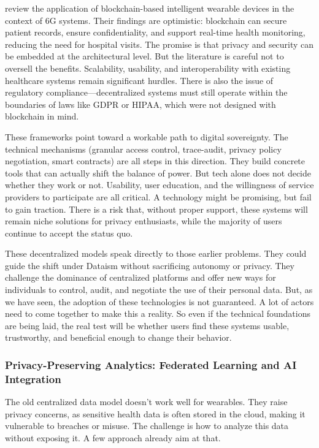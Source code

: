 	\cite{Boonsong2024} review the application of blockchain-based intelligent wearable devices in the context of 6G systems. Their findings are optimistic: blockchain can secure patient records, ensure confidentiality, and support real-time health monitoring, reducing the need for hospital visits. The promise is that privacy and security can be embedded at the architectural level. But the literature is careful not to oversell the benefits. Scalability, usability, and interoperability with existing healthcare systems remain significant hurdles. There is also the issue of regulatory compliance—decentralized systems must still operate within the boundaries of laws like GDPR or HIPAA, which were not designed with blockchain in mind.

	These frameworks point toward a workable path to digital sovereignty. The technical mechanisms (granular access control, trace-audit, privacy policy negotiation, smart contracts) are all steps in this direction. They build concrete tools that can actually shift the balance of power. But tech alone does not decide whether they work or not. Usability, user education, and the willingness of service providers to participate are all critical. A technology might be promising, but fail to gain traction. There is a risk that, without proper support, these systems will remain niche solutions for privacy enthusiasts, while the majority of users continue to accept the status quo.

	These decentralized models speak directly to those earlier problems. They could guide the shift under Dataism without sacrificing autonomy or privacy. They challenge the dominance of centralized platforms and offer new ways for individuals to control, audit, and negotiate the use of their personal data. But, as we have seen, the adoption of these technologies is not guaranteed. A lot of actors need to come together to make this a reality. So even if the technical foundations are being laid, the real test will be whether users find these systems usable, trustworthy, and beneficial enough to change their behavior.
	\subsubsection{Privacy-Preserving Analytics: Federated Learning and AI Integration}

	The old centralized data model doesn't work well for wearables. They raise privacy concerns, as sensitive health data is often stored in the cloud, making it vulnerable to breaches or misuse. The challenge is how to analyze this data without exposing it. A few approach already aim at that. 


